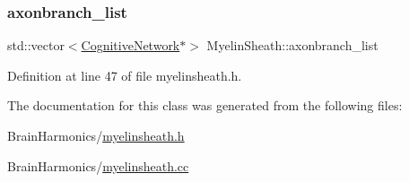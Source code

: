 \subsubsection{\texorpdfstring{axonbranch\+\_\+list}{axonbranch\_list}}
{\footnotesize\ttfamily std\+::vector$<$\hyperlink{class_cognitive_network}{Cognitive\+Network}$\ast$$>$ Myelin\+Sheath\+::axonbranch\+\_\+list\hspace{0.3cm}{\ttfamily [protected]}}



Definition at line 47 of file myelinsheath.\+h.



The documentation for this class was generated from the following files\+:\begin{DoxyCompactItemize}
\item 
Brain\+Harmonics/\hyperlink{myelinsheath_8h}{myelinsheath.\+h}\item 
Brain\+Harmonics/\hyperlink{myelinsheath_8cc}{myelinsheath.\+cc}\end{DoxyCompactItemize}
